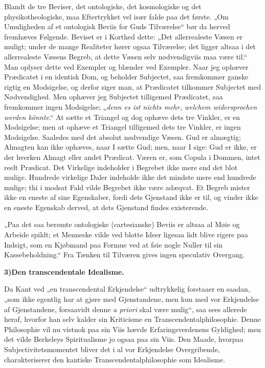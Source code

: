 \documentclass[12pt]{book}
\newcommand{\opage}[1]{\marginnote{\footnotesize\textit{[#1]}}}
\begin{document}
Blandt de tre Beviser, det ontologiske, det kosmologiske og det
physikotheologiske, maa Eftertrykket vel især falde paa det første. „Om
Umuligheden af et ontologisk Beviis for Guds Tilværelse“ bør da herved fremhæves
Følgende. Beviset er i Korthed dette: „Det allerrealeste Væsen er muligt; under de
mange Realiteter hører ogsaa Tilværelse; det ligger altsaa i det allerrealeste
Væsens Begreb, at dette Væsen selv nødvendigviis maa være til.“ Man oplyser dette
ved
\opage{31} Exempler og blænder ved Exempler. Naar jeg ophæver Prædicatet i en identisk Dom, og
beholder Subjectet, saa fremkommer ganske rigtig en Modsigelse, og derfor siger
man, at Prædicatet tilkommer Subjectet med Nødvendighed. Men ophæver jeg Subjectet
tilligemed Prædicatet, saa fremkommer ingen Modsigelse; „\textit{denn es ist nichts
mehr, welchem widersprochen werden könnte}.“ At sætte et Triangel og dog ophæve
dets tre Vinkler, er en Modsigelse; men at ophæve et Triangel tilligemed dets tre
Vinkler, er ingen Modsigelse. Saaledes med det absolut nødvendige Væsen. Gud er
almægtig; Almagten kan ikke ophæves, naar I sætte Gud; men, naar I sige: Gud er
ikke, er der hverken Almagt eller andet Prædicat. Væren er, som Copula i Dommen,
intet reelt Prædicat. Det Virkelige indeholder i Begrebet ikke mere end det blot
mulige. Hundrede virkelige Daler indeholde ikke det mindste mere end hundrede
mulige; thi i modsat Fald vilde Begrebet ikke være adæqvat. Et Begreb mister ikke
en eneste af sine Egenskaber, fordi dets Gjenstand ikke er til, og vinder ikke en
eneste Egenskab derved, at dets Gjenstand findes existerende.

„Paa det saa berømte ontologiske (cartesianske) Beviis er altsaa al Møie og Arbeide
spildt; et Menneske vilde ved blotte Ideer ligesaa lidt blive rigere paa Indsigt,
som en Kjøbmand paa Formue ved at føie nogle Nuller til sin Kassebeholdning.“ Fra
Tænken til Tilværen gives ingen speculativ Overgang.

\begin{center}{\bfseries 3)\quad Den transcendentale Idealisme.}\end{center}

Da Kant ved „en transcendental Erkjendelse“ udtrykkelig forstaaer en saadan, „som
ikke egentlig har at gjøre med Gjenstandene, men kun med vor Erkjendelse af
Gjenstandene, forsaavidt denne \textit{a priori} skal være mulig“, saa sees allerede
heraf, hvorfor han selv kalder sin Kriticisme en Transcendentalphilosophie. Denne
Philosophie vil nu vistnok paa sin Viis hævde Erfaringsverdenens Gyldighed; men det
vilde
\opage{32} Berkeleys Spiritualisme jo ogsaa paa sin Viis. Den Maade, hvorpaa
Subjectivitetsmomentet bliver det i al vor Erkjendelse Overgribende, charakteriserer
den kantiske Transcendentalphilosophie som Idealisme.
\end{document}
